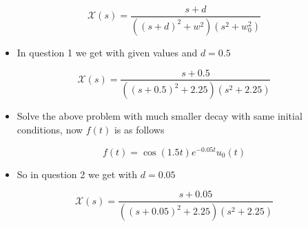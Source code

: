 \documentclass[11pt, a4paper]{article}
\begin{document}
\begin{equation}
    \mathcal{X}(s) = \frac{s+d}{((s+d)^2 + w^2)(s^2 + w_{0}^{2})}
\end{equation}

\begin{itemize}

\item
  In question 1 we get with given values and \(d = 0.5\)
\end{itemize}

\begin{equation}
    \mathcal{X}(s) = \frac{s+0.5}{((s+0.5)^2 + 2.25)(s^2 + 2.25)}
\end{equation}

\begin{itemize}

\item
  Solve the above problem with much smaller decay with same initial
  conditions, now \(f(t)\) is as follows
\end{itemize}

\begin{equation}
f(t) = \cos(1.5t) e^{-0.05t}u_0(t)
\end{equation}

\begin{itemize}

\item
  So in question 2 we get with \(d = 0.05\)
\end{itemize}

\begin{equation}
    \mathcal{X}(s) = \frac{s+0.05}{((s+0.05)^2 + 2.25)(s^2 + 2.25)}
\end{equation}
\end{document}
